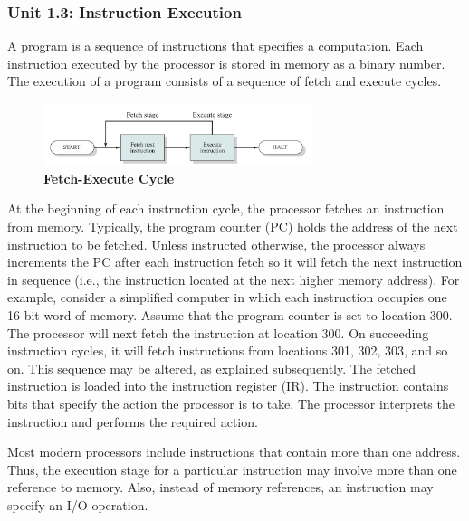 \documentclass{article}
\begin{document}
\subsubsection*{Unit 1.3: Instruction Execution}
{}

A program is a sequence of instructions that specifies a computation. Each instruction executed by the processor is stored in memory as a binary number.
The execution of a program consists of a sequence of fetch and execute cycles. 

\begin{figure}[!h]
    \centering
    \includegraphics[width=0.7\textwidth]{figures/Ch01Figure2.png} %
    \caption{\textbf{Fetch-Execute Cycle}}
    \label{fig:Ch01Fig2}
\end{figure}
At the beginning of each instruction cycle, the processor fetches an instruction
from memory. Typically, the program counter (PC) holds the address of the
next instruction to be fetched. Unless instructed otherwise, the processor always
increments the PC after each instruction fetch so it will fetch the next instruction
in sequence (i.e., the instruction located at the next higher memory address). For
example, consider a simplified computer in which each instruction occupies one 16-bit
word of memory. Assume that the program counter is set to location 300. The processor
will next fetch the instruction at location 300. On succeeding instruction cycles, it
will fetch instructions from locations 301, 302, 303, and so on. This sequence may be
altered, as explained subsequently.
The fetched instruction is loaded into the instruction register (IR). The instruction
contains bits that specify the action the processor is to take. The processor interprets
the instruction and performs the required action.

\vspace{0.5em}

Most modern processors include instructions that contain more than one address.
Thus, the execution stage for a particular instruction may involve more than one
reference to memory. Also, instead of memory references, an instruction may specify
an I/O operation.
\end{document}
